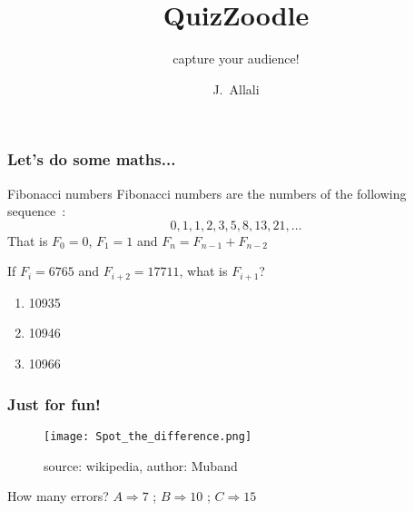 \documentclass[serif]{beamer}
\title{QuizZoodle}
\subtitle{capture your audience!}
\author{J.~Allali}
\institute{QuizZoodle}
\date{}
\newif\ifQDLE
\begin{document}
\renewcommand*{\theenumi}{\Alph{enumi}}

\begin{frame}
  \titlepage
\end{frame}

\ifQDLE\begin{frame}
\frametitle{Example of a survey}
\begin{block}{How are you today?}
\begin{enumerate}
\item Excellent
\item Very Good
\item Good
\item Not so Good
\end{enumerate}
\end{block}
\QdleTag{S}{ABCD}{20} %
\end{frame}
\fi 

\begin{frame}[fragile]
\frametitle{Let's do some maths...}
\begin{block}{Fibonacci numbers}
Fibonacci numbers are the numbers of the following sequence~:\\
$$
0,1,1,2,3,5,8,13,21,\dots
$$
That is $F_0=0$, $F_1=1$ and $F_n = F_{n-1} + F_{n-2}$
\end{block}
\pause
\begin{block}{If $F_i=6765$ and $F_{i+2}=17711$, what is $F_{i+1}$?}
\begin{enumerate}
\item 10935
\item 10946
\item 10966
\end{enumerate}
\end{block}
\end{frame}

\begin{frame}[fragile]
\frametitle{Just for fun!}
\begin{figure}
   \texttt{[image: Spot\_the\_difference.png]}
   \caption{source: wikipedia, author: Muband}
\end{figure}
How many errors? $A\Rightarrow 7$ ;  $B \Rightarrow 10$ ; $C \Rightarrow 15$
\end{frame}
\end{document}
